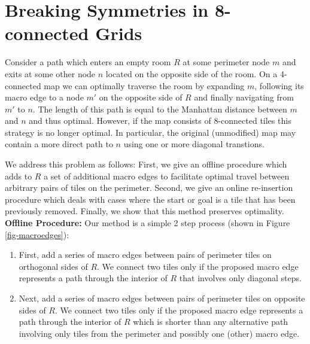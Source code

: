 \section{Breaking Symmetries in 8-connected Grids}


Consider a path which enters an empty room $R$ at some perimeter node $m$ and exits at some other
node $n$ located on the opposite side of the room.
On a 4-connected map we can optimally traverse the room by expanding $m$, following
its macro edge to a node $m'$ on the opposite side of $R$ and finally navigating from $m'$ to $n$.
The length of this path is equal to the Manhattan distance between $m$ and $n$ and thus optimal.
However, if the map consists of 8-connected tiles this strategy is no longer optimal.
In particular, the original (unmodified) map may contain a more direct path to $n$ using one or more diagonal
transtions.
\par
We address this problem as follows:
First, we give an offline procedure which adds to $R$ a set of additional macro edges
to facilitate optimal travel between arbitrary pairs of tiles on the perimeter.
Second, we give an online re-insertion procedure which deals with cases where the start or
goal is a tile that has been previously removed.
Finally, we show that this method preserves optimality.
\\ \newline
\textbf{Offline Procedure: }
Our method is a simple 2 step process (shown in Figure \ref{fig-macroedges}):

\begin{enumerate}
\item{First, add a series of macro edges between pairs of perimeter tiles on orthogonal sides of $R$. 
We connect two tiles only if the proposed macro edge represents a path through the interior of $R$ that involves
only diagonal steps. }
\item{Next, add a series of macro edges between pairs of perimeter tiles on opposite sides of $R$.
We connect two tiles only if the proposed macro edge represents a path through the interior of $R$ which is shorter
than any alternative path involving only tiles from the perimeter and possibly one (other) macro edge.
}
\end{enumerate}

